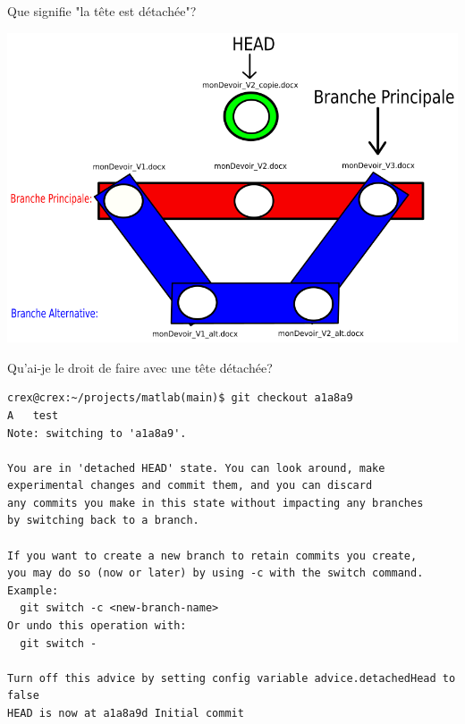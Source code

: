 \documentclass{beamer}
\begin{document}
\begin{frame}{Que signifie "la tête est détachée"?}
    \begin{center}
        \includegraphics[scale=0.35]{images/detachedHead/detachedHead1.png}
    \end{center}
\end{frame}


\begin{frame}[fragile]{Qu'ai-je le droit de faire avec une tête détachée?}

\begin{mdframed}[style=Bash]
\begin{lstlisting}[style=Bash, caption={Des droits spéciaux avec une tête détachée}]
crex@crex:~/projects/matlab(main)$ git checkout a1a8a9
A	test
Note: switching to 'a1a8a9'.

You are in 'detached HEAD' state. You can look around, make 
experimental changes and commit them, and you can discard 
any commits you make in this state without impacting any branches 
by switching back to a branch.

If you want to create a new branch to retain commits you create, 
you may do so (now or later) by using -c with the switch command. 
Example:
  git switch -c <new-branch-name>
Or undo this operation with:
  git switch -

Turn off this advice by setting config variable advice.detachedHead to false
HEAD is now at a1a8a9d Initial commit
\end{lstlisting}
\end{mdframed}
\end{frame}
\end{document}

